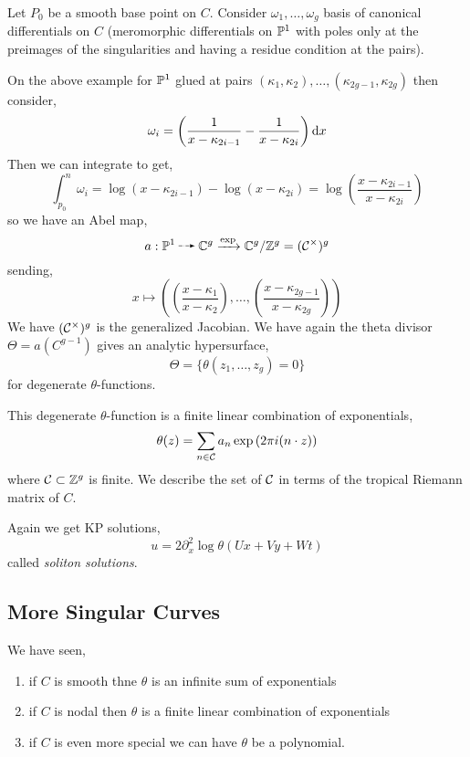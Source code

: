 \documentclass[12pt]{article}
\begin{document}
Let $P_0$ be a smooth base point on $C$. Consider $\omega_1, \dots, \omega_g$ basis of canonical differentials on $C$ (meromorphic differentials on $\P^1$ with poles only at the preimages of the singularities and having a residue condition at the pairs).

\begin{example}
On the above example for $\P^1$ glued at pairs $(\kappa_1, \kappa_2), \dots, (\kappa_{2g-1}, \kappa_{2g})$ then consider,
\[ \omega_i = \left( \frac{1}{x - \kappa_{2i - 1}} - \frac{1}{x - \kappa_{2i}} \right) \d{x} \]
Then we can integrate to get,
\[ \int_{p_0}^n \omega_i = \log{(x - \kappa_{2i - 1})} - \log{(x - \kappa_{2i})} = \log{\left( \frac{x - \kappa_{2i - 1}}{x - \kappa_{2i}} \right)} \]
so we have an Abel map,
\[ a : \P^1 \rat \CC^g \xrightarrow{\exp} \CC^g / \ZZ^g = (\C^\times)^g \]
sending,
\[ x \mapsto \left( \left( \frac{x - \kappa_1}{x - \kappa_2} \right), \dots, \left( \frac{x - \kappa_{2g - 1}}{x - \kappa_{2g}} \right) \right) \]
We have $(\C^\times)^g$ is the generalized Jacobian. We have again the theta divisor $\Theta = a(C^{g-1})$ gives an analytic hypersurface,
\[ \Theta = \{ \theta(z_1, \dots, z_g) = 0 \} \]
for degenerate $\theta$-functions.
\end{example}

\begin{theorem}
This degenerate $\theta$-function is a finite linear combination of exponentials,
\[ \theta(z) = \sum_{n \in \C} a_n \exp{(2 \pi i (n \cdot z))} \]
where $\C \subset \ZZ^g$ is finite. We describe the set of $\C$ in terms of the tropical Riemann matrix of $C$. 
\end{theorem}

\begin{rmk}
Again we get KP solutions,
\[ u = 2 \partial_x^2 \log{\theta(U x + V y + W t)} \]
called \textit{soliton solutions}. 
\end{rmk}

\subsection{More Singular Curves}

We have seen,
\begin{enumerate}
\item if $C$ is smooth thne $\theta$ is an infinite sum of exponentials
\item if $C$ is nodal then $\theta$ is a finite linear combination of exponentials
\item if $C$ is even more special we can have $\theta$ be a polynomial.
\end{enumerate}
\end{document}
